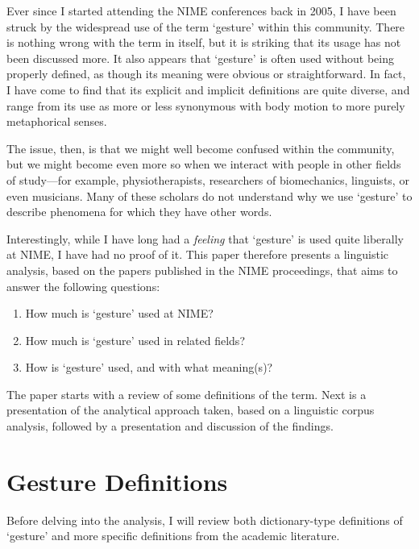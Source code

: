 Ever since I started attending the NIME conferences back in 2005, I have been struck by the widespread use of the term `gesture' within this community. There is nothing wrong with the term in itself, but it is striking that its usage has not been discussed more. It also appears that `gesture' is often used without being properly defined, as though its meaning were obvious or straightforward. In fact, I have come to find that its explicit and implicit definitions are quite diverse, and range from its use as more or less synonymous with body motion to more purely metaphorical senses. 

The issue, then, is that we might well become confused within the community, but we might become even more so when we interact with people in other fields of study---for example, physiotherapists, researchers of biomechanics, linguists, or even musicians. Many of these scholars do not understand why we use `gesture' to describe phenomena for which they have other words. 

Interestingly, while I have long had a \emph{feeling} that `gesture' is used quite liberally at NIME, I have had no proof of it. This paper therefore presents a linguistic analysis, based on the papers published in the NIME proceedings, that aims to answer the following questions: 

\begin{enumerate}
\item How much is `gesture' used at NIME? 
\item How much is `gesture' used in related fields?
\item How is `gesture' used, and with what meaning(s)? 
\end{enumerate}

The paper starts with a review of some definitions of the term. Next is a presentation of the analytical approach taken, based on a linguistic corpus analysis, followed by a presentation and discussion of the findings. 



\section{Gesture Definitions}
\label{Jensenius:definitions}

Before delving into the analysis, I will review both dictionary-type definitions of `gesture' and more specific definitions from the academic literature. 


